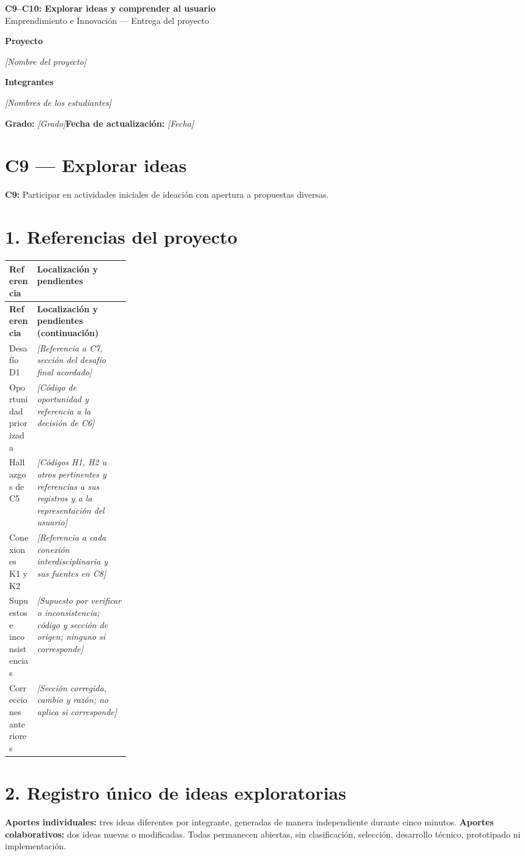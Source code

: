 \documentclass[12pt,a4paper]{article}
\newcommand{\campo}[1]{\textcolor{InstructionColor}{\textit{[#1]}}}
\newcommand{\concept}[1]{\textcolor{ConceptColor}{\textbf{#1}}}
\newcommand{\respuesta}[2]{\par\textbf{#1}\par\campo{#2}\par}
\begin{document}
\raggedbottom
\begin{center}
{\Large\bfseries\color{HeadingColor} C9--C10: Explorar ideas y comprender al usuario}\\[3pt]
Emprendimiento e Innovación --- Entrega del proyecto
\end{center}
\respuesta{Proyecto}{Nombre del proyecto}
\respuesta{Integrantes}{Nombres de los estudiantes}
\textbf{Grado:} \campo{Grado}\hfill\textbf{Fecha de actualización:} \campo{Fecha}

\section*{C9 --- Explorar ideas}
\concept{C9:} Participar en actividades iniciales de ideación con apertura a propuestas diversas.

\section*{1. Referencias del proyecto}
{\small
\begin{longtable}{|P{0.23\linewidth}|P{\arrayrulewidth\relax}|}
\hline
\textbf{Referencia} & \textbf{Localización y pendientes} \\\hline
\endfirsthead
\hline\textbf{Referencia} & \textbf{Localización y pendientes (continuación)} \\\hline
\endhead
Desafío D1 & \campo{Referencia a C7, sección del desafío final acordado} \\\hline
Oportunidad priorizada & \campo{Código de oportunidad y referencia a la decisión de C6} \\\hline
Hallazgos de C5 & \campo{Códigos H1, H2 u otros pertinentes y referencias a sus registros y a la representación del usuario} \\\hline
Conexiones K1 y K2 & \campo{Referencia a cada conexión interdisciplinaria y sus fuentes en C8} \\\hline
Supuestos e inconsistencias & \campo{Supuesto por verificar o inconsistencia; código y sección de origen; ninguno si corresponde} \\\hline
Correcciones anteriores & \campo{Sección corregida, cambio y razón; no aplica si corresponde} \\\hline
\end{longtable}
}

\section*{2. Registro único de ideas exploratorias}
\textbf{Aportes individuales:} tres ideas diferentes por integrante, generadas de manera independiente durante cinco minutos. \textbf{Aportes colaborativos:} dos ideas nuevas o modificadas. Todas permanecen abiertas, sin clasificación, selección, desarrollo técnico, prototipado ni implementación.
\end{document}
